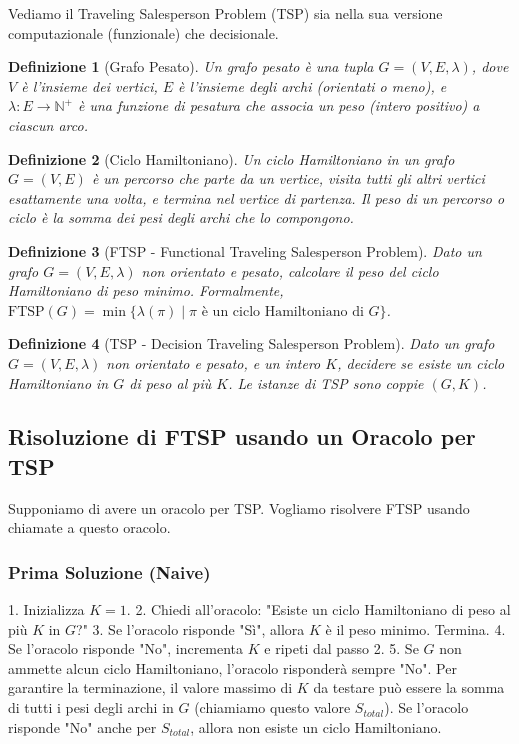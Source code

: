 \documentclass[a4paper]{article}
\newtheorem{definition}{Definizione}
\begin{document}
Vediamo il Traveling Salesperson Problem (TSP) sia nella sua versione computazionale (funzionale) che decisionale.

\begin{definition}[Grafo Pesato]
Un grafo pesato è una tupla $G = (V, E, \lambda)$, dove $V$ è l'insieme dei vertici, $E$ è l'insieme degli archi (orientati o meno), e $\lambda: E \to \mathbb{N}^+$ è una funzione di pesatura che associa un peso (intero positivo) a ciascun arco.
\end{definition}

\begin{definition}[Ciclo Hamiltoniano]
Un ciclo Hamiltoniano in un grafo $G=(V, E)$ è un percorso che parte da un vertice, visita tutti gli altri vertici esattamente una volta, e termina nel vertice di partenza. Il peso di un percorso o ciclo è la somma dei pesi degli archi che lo compongono.
\end{definition}

\begin{definition}[FTSP - Functional Traveling Salesperson Problem]
Dato un grafo $G=(V, E, \lambda)$ non orientato e pesato, calcolare il peso del ciclo Hamiltoniano di peso minimo.
Formalmente, $\text{FTSP}(G) = \min \{ \lambda(\pi) \mid \pi \text{ è un ciclo Hamiltoniano di } G \}$.
\end{definition}

\begin{definition}[TSP - Decision Traveling Salesperson Problem]
Dato un grafo $G=(V, E, \lambda)$ non orientato e pesato, e un intero $K$, decidere se esiste un ciclo Hamiltoniano in $G$ di peso al più $K$.
Le istanze di TSP sono coppie $(G, K)$.
\end{definition}

\subsection{Risoluzione di FTSP usando un Oracolo per TSP}

Supponiamo di avere un oracolo per TSP. Vogliamo risolvere FTSP usando chiamate a questo oracolo.

\subsubsection{Prima Soluzione (Naive)}
1.  Inizializza $K=1$.
2.  Chiedi all'oracolo: "Esiste un ciclo Hamiltoniano di peso al più $K$ in $G$?"
3.  Se l'oracolo risponde "Sì", allora $K$ è il peso minimo. Termina.
4.  Se l'oracolo risponde "No", incrementa $K$ e ripeti dal passo 2.
5.  Se $G$ non ammette alcun ciclo Hamiltoniano, l'oracolo risponderà sempre "No". Per garantire la terminazione, il valore massimo di $K$ da testare può essere la somma di tutti i pesi degli archi in $G$ (chiamiamo questo valore $S_{total}$). Se l'oracolo risponde "No" anche per $S_{total}$, allora non esiste un ciclo Hamiltoniano.
\end{document}
